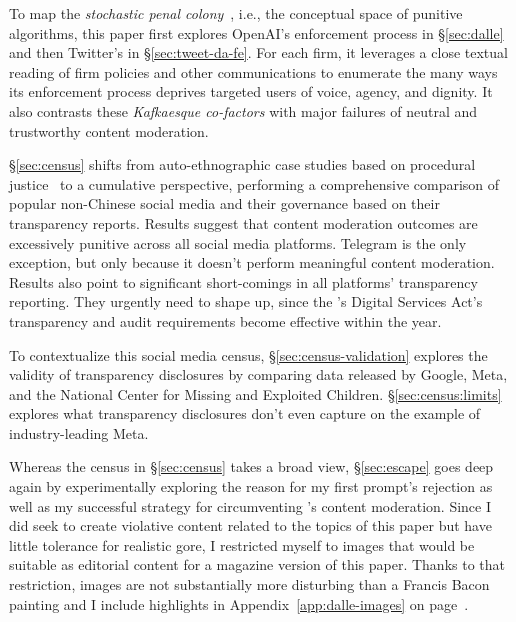 To map the \emph{stochastic penal colony}~, i.e., the
conceptual space of punitive algorithms, this paper first explores OpenAI's
enforcement process in \S\ref{sec:dalle} and then Twitter's in
\S\ref{sec:tweet-da-fe}. For each firm, it leverages a close textual reading of
firm policies and other communications to enumerate the many ways its
enforcement process deprives targeted users of voice, agency, and dignity. It
also contrasts these \emph{Kafkaesque co-factors} with major failures of neutral
and trustworthy content moderation.

\S\ref{sec:census} shifts from auto-ethnographic case studies based on
procedural justice~\cite{Tyler2003,Tyler2006,Tyler2007} to a cumulative
perspective, performing a comprehensive comparison of popular non-Chinese social
media and their governance based on their transparency reports. Results suggest
that content moderation outcomes are excessively punitive across all social
media platforms. Telegram is the only exception, but only because it doesn't
perform meaningful content moderation. Results also point to significant
short-comings in all platforms' transparency reporting. They urgently need to
shape up, since the \EU's Digital Services Act's transparency and audit
requirements become effective within the year.

To contextualize this social media census, \S\ref{sec:census-validation}
explores the validity of transparency disclosures by comparing data released by
Google, Meta, and the National Center for Missing and Exploited Children.
\S\ref{sec:census:limits} explores what transparency disclosures don't even
capture on the example of industry-leading Meta.

Whereas the census in \S\ref{sec:census} takes a broad view, \S\ref{sec:escape}
goes deep again by experimentally exploring the reason for my first prompt's
rejection as well as my successful strategy for circumventing \DALLE's content
moderation. Since I did seek to create violative content related to the topics
of this paper but have little tolerance for realistic gore, I restricted myself
to images that would be suitable as editorial content for a magazine version of
this paper. Thanks to that restriction, images are not substantially more
disturbing than a Francis Bacon painting and I include highlights in
Appendix~\ref{app:dalle-images} on page~\pageref{app:dalle-images}.

